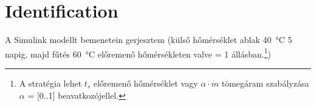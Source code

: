 \section{Identification}



A Simulink modellt bemenetein gerjesztem (külső hőmérséklet ablak \SI{40}{\celsius} 5 napig, majd fűtés \SI{60}{\celsius} előremenő hőmérsékleten valve = 1 állásban.\footnote{A stratégia lehet $t_s$ előremenő hőmérséklet vagy $\alpha \cdot \dot m$ tömegáram szabályzása $\alpha$ = [0..1] beavatkozójellel. })

\pagebreak